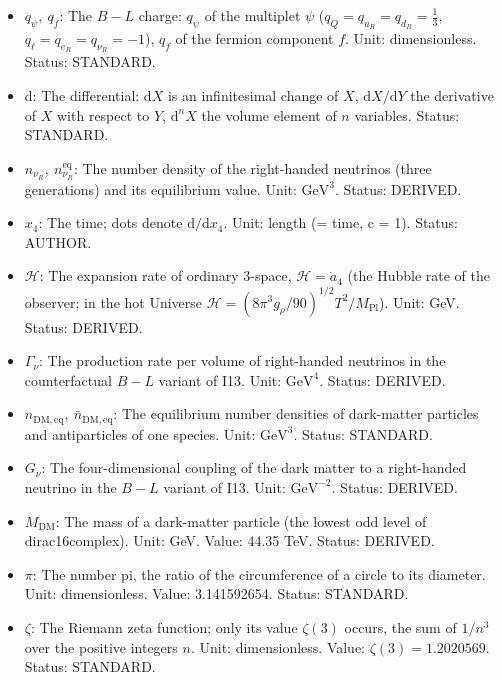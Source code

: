 \documentclass[
  10pt,
]{article}
\begin{document}
\begin{itemize}
  \(o\) runs over the orbitals. Status: RECORD.
\item
  \(q_\psi,\ q_f\): The \(B - L\) charge: \(q_\psi\) of the multiplet
  \(\psi\) (\(q_Q = q_{u_R} = q_{d_R} = \frac13\),
  \(q_\ell = q_{e_R} = q_{\nu_R} = -1\)), \(q_f\) of the fermion
  component \(f\). Unit: dimensionless. Status: STANDARD.
\item
  \(\mathrm{d}\): The differential: \(\mathrm{d}X\) is an infinitesimal
  change of \(X\), \(\mathrm{d}X/\mathrm{d}Y\) the derivative of \(X\)
  with respect to \(Y\), \(\mathrm{d}^nX\) the volume element of \(n\)
  variables. Status: STANDARD.
\item
  \(n_{\nu_R},\ n_{\nu_R}^{\mathrm{eq}}\): The number density of the
  right-handed neutrinos (three generations) and its equilibrium value.
  Unit: \(\mathrm{GeV}^{3}\). Status: DERIVED.
\item
  \(x_4\): The time; dots denote \(\mathrm{d}/\mathrm{d}x_4\). Unit:
  length (= time, c = 1). Status: AUTHOR.
\item
  \(\mathcal{H}\): The expansion rate of ordinary 3-space,
  \(\mathcal{H} = \dot a_4\) (the Hubble rate of the observer; in the
  hot Universe
  \(\mathcal{H} = (8\pi^3g_\rho/90)^{1/2}T^2/M_{\mathrm{Pl}}\)). Unit:
  GeV. Status: DERIVED.
\item
  \(\Gamma_\nu\): The production rate per volume of right-handed
  neutrinos in the counterfactual \(B - L\) variant of I13. Unit:
  \(\mathrm{GeV}^{4}\). Status: DERIVED.
\item
  \(n_{\mathrm{DM,eq}},\ \bar n_{\mathrm{DM,eq}}\): The equilibrium
  number densities of dark-matter particles and antiparticles of one
  species. Unit: \(\mathrm{GeV}^{3}\). Status: STANDARD.
\item
  \(G_\nu\): The four-dimensional coupling of the dark matter to a
  right-handed neutrino in the \(B - L\) variant of I13. Unit:
  \(\mathrm{GeV}^{-2}\). Status: DERIVED.
\item
  \(M_{\mathrm{DM}}\): The mass of a dark-matter particle (the lowest
  odd level of dirac16complex). Unit: GeV. Value: 44.35 TeV. Status:
  DERIVED.
\item
  \(\pi\): The number pi, the ratio of the circumference of a circle to
  its diameter. Unit: dimensionless. Value: 3.141592654. Status:
  STANDARD.
\item
  \(\zeta\): The Riemann zeta function; only its value \(\zeta(3)\)
  occurs, the sum of \(1/n^3\) over the positive integers \(n\). Unit:
  dimensionless. Value: \(\zeta(3) = 1.2020569\). Status: STANDARD.

\end{itemize}
\end{document}
